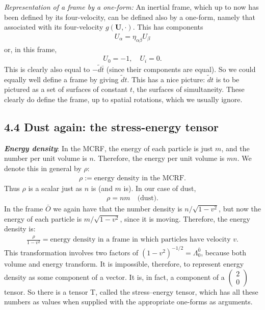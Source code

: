 \documentclass[11pt,letterpaper]{book}
\begin{document}
    \textit{Representation of a frame by a one-form:} 
    An inertial frame, which up to now has been defined by its four-velocity, can be defined also by a one-form, namely that associated with its four-velocity \(g(\mathbf{U}, \cdot)\). This has components
    \begin{align}
    U_\alpha = \eta_{\alpha\beta} U_\beta
    \end{align}
    or, in this frame,
    \begin{align}
    U_0 = -1, \quad U_i = 0.
    \end{align}
    This is clearly also equal to \(-\tilde{d}\bar{t}\) (since their components are equal). So we could equally well define a frame by giving \(\tilde{d} t\). This has a nice picture: \(\tilde{d} t\) is to be pictured as a set of surfaces of constant \(t\), the surfaces of simultaneity. These clearly do define the frame, up to spatial rotations, which we usually ignore.

    \subsection{4.4 Dust again: the stress-energy tensor}

    \textit{\textbf{Energy density}}:
    In the MCRF, the energy of each particle is just \(m\), and the number per unit volume is \(n\). Therefore, the energy per unit volume is \(mn\). We denote this in general by \(\rho\):
    \begin{align}
    \rho := \text{energy density in the MCRF}. \tag{4.11}
    \end{align}
    Thus \(\rho\) is a scalar just as \(n\) is (and \(m\) is). In our case of dust,
    \begin{align}
    \rho = nm \quad \text{(dust)}. \tag{4.12}
    \end{align}
    In the frame \(\bar{O}\) we again have that the number density is \(n / \sqrt{1 - v^2}\), but now the energy of each particle is \(m / \sqrt{1 - v^2}\), since it is moving. Therefore, the energy density is:
    \begin{align}
    \frac{\rho}{1 - v^2} = \text{energy density in a frame in which particles have velocity } v. \tag{4.13}
    \end{align}
    This transformation involves two factors of \((1 - v^2)^{-1/2} = \Lambda^{\bar 0} _0\), because both volume and energy transform. It is impossible, therefore, to represent energy density as some component of a vector. It is, in fact, a component of a \( \begin{pmatrix} 2 \\ 0 \end{pmatrix} \) tensor. So there is a tensor T, called the stress–energy tensor, which has all these numbers as values when supplied with the appropriate one-forms as arguments.
    
\end{document}
